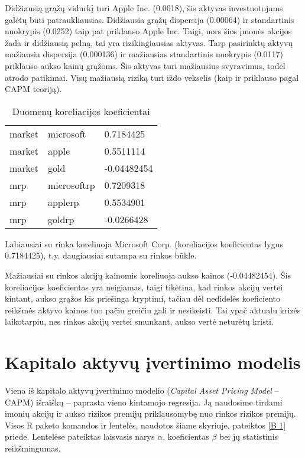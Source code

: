 \documentclass[12pt, a14paper, lithuanian]{article}
\begin{document}
Didžiausią grąžų vidurkį turi Apple Inc. (0.0018), šis aktyvas investuotojams galėtų būti  patraukliausias.
Didžiausia grąžų dispersija (0.00064) ir standartinis nuokrypis (0.0252) taip pat priklauso Apple Inc. Taigi, nors šios įmonės akcijos žada ir didžiausią pelną, tai yra rizikingiausias aktyvas.
Tarp pasirinktų aktyvų mažiausia dispersija (0.000136) ir mažiausias standartinis nuokrypis (0.0117) priklauso aukso kainų grąžoms. Šis aktyvas turi mažiausius svyravimus, todėl atrodo patikimai. Visų mažiausią riziką turi iždo vekselis (kaip ir priklauso pagal CAPM teoriją).


\begin{table}[ht]
\begin{center}
    \begin{tabular}{ | l | l | l | }
    \hline
    market & microsoft & 0.7184425 \\
  market & apple & 0.5511114 \\
	market & gold & -0.04482454 \\
	mrp & microsoftrp & 0.7209318 \\
	mrp & applerp & 0.5534901 \\
	mrp & goldrp & -0.0266428 \\
	\hline
    \end{tabular}
\end{center}
\caption{Duomenų koreliacijos koeficientai}
\end{table}


Labiausiai su rinka koreliuoja Microsoft Corp. (koreliacijos koeficientas lygus 0.7184425), t.y. daugiausiai sutampa su rinkos būkle.

Mažiausiai su rinkos akcijų kainomis koreliuoja aukso kainos (-0.04482454). Šis koreliacijos koeficientas yra neigiamas, taigi tikėtina, kad rinkos akcijų vertei kintant, aukso grąžos kis priešinga kryptimi, tačiau dėl nedidelės koeficiento reikšmės aktyvo kainos tuo pačiu greičiu gali ir nesikeisti. Tai ypač aktualu krizės laikotarpiu, nes rinkos akcijų vertei smunkant, aukso vertė neturėtų kristi.



\newpage
\section{Kapitalo aktyvų įvertinimo modelis}

Viena iš kapitalo aktyvų įvertinimo modelio (\textit{Capital Asset Pricing Model} -- CAPM) išraiškų -- paprasta vieno kintamojo regresija. Ją naudosime tirdami imonių akcijų ir aukso rizikos premijų priklausomybę nuo rinkos rizikos premijų. Visos R paketo komandos ir lentelės, naudotos šiame skyriuje, pateiktos \ref{B 1} priede.
Lentelėse pateiktas laisvasis narys $ \alpha $, koeficientas  $ \beta $ bei jų statistinis reikšmingumas.\\
\end{document}
